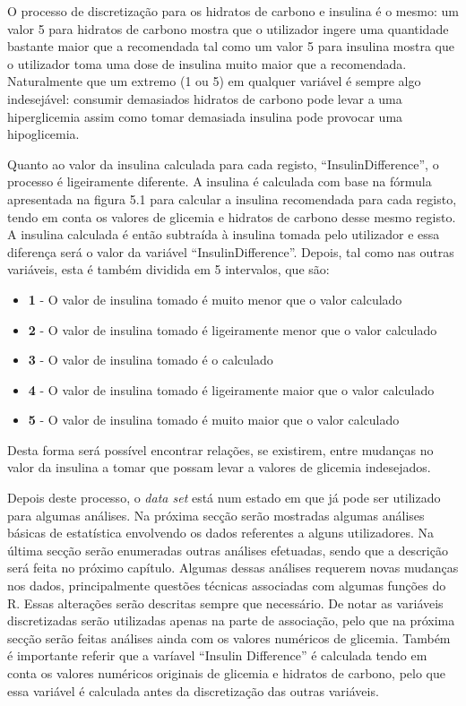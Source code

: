 O processo de discretização para os hidratos de carbono e insulina é o mesmo: um valor 5 para hidratos de carbono mostra que o utilizador ingere uma quantidade bastante maior que a recomendada tal como um valor 5 para insulina mostra que o utilizador toma uma dose de insulina muito maior que a recomendada. Naturalmente que um extremo (1 ou 5) em qualquer variável é sempre algo indesejável: consumir demasiados hidratos de carbono pode levar a uma hiperglicemia assim como tomar demasiada insulina pode provocar uma hipoglicemia.

Quanto ao valor da insulina calculada para cada registo, ``Insulin\textunderscore Difference'', o processo é ligeiramente diferente. A insulina é calculada com base na fórmula apresentada na figura 5.1 para calcular a insulina recomendada para cada registo, tendo em conta os valores de glicemia e hidratos de carbono desse mesmo registo. A insulina calculada é então subtraída à insulina tomada pelo utilizador e essa diferença será o valor da variável ``Insulin\textunderscore Difference''. Depois, tal como nas outras variáveis, esta é também dividida em 5 intervalos, que são:

\begin{itemize}
\item \textbf{1} - O valor de insulina tomado é muito menor que o valor calculado
\item \textbf{2} - O valor de insulina tomado é ligeiramente menor que o valor calculado
\item \textbf{3} - O valor de insulina tomado é o calculado
\item \textbf{4} - O valor de insulina tomado é ligeiramente maior que o valor calculado
\item \textbf{5} - O valor de insulina tomado é muito maior que o valor calculado
\end{itemize}
Desta forma será possível encontrar relações, se existirem, entre mudanças no valor da insulina a tomar que possam levar a valores de glicemia indesejados. 


Depois deste processo, o \textit{data set} está num estado em que já pode ser utilizado para algumas análises. Na próxima secção serão mostradas algumas análises básicas de estatística envolvendo os dados referentes a alguns utilizadores. Na última secção serão enumeradas outras análises efetuadas, sendo que a descrição será feita no próximo capítulo. Algumas dessas análises requerem novas mudanças nos dados, principalmente questões técnicas associadas com algumas funções do R. Essas alterações serão descritas sempre que necessário. De notar as variáveis discretizadas serão utilizadas apenas na parte de associação, pelo que na próxima secção serão feitas análises ainda com os valores numéricos de glicemia. Também é importante referir que a varíavel ``Insulin \textunderscore Difference'' é calculada tendo em conta os valores numéricos originais de glicemia e hidratos de carbono, pelo que essa variável é calculada antes da discretização das outras variáveis. 

